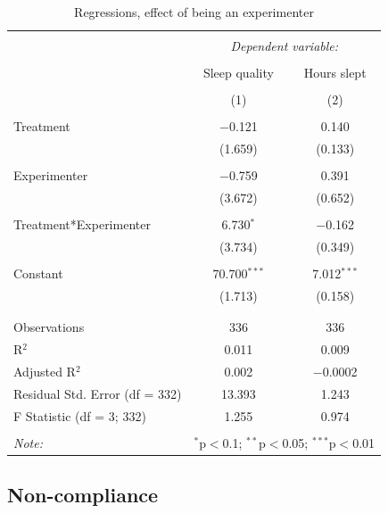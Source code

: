 \documentclass[12pt,]{article}
\begin{document}
\begin{table}[!htbp] \centering 
  \caption{\label{tab:experimenter_regression} Regressions, effect of being an experimenter} 
  \label{} 
\begin{tabular}{@{\extracolsep{5pt}}lcc} 
\\[-1.8ex]\hline 
\hline \\[-1.8ex] 
 & \multicolumn{2}{c}{\textit{Dependent variable:}} \\ 
\cline{2-3} 
\\[-1.8ex] & Sleep quality & Hours slept \\ 
\\[-1.8ex] & (1) & (2)\\ 
\hline \\[-1.8ex] 
 Treatment & $-$0.121 & 0.140 \\ 
  & (1.659) & (0.133) \\ 
  & & \\ 
 Experimenter & $-$0.759 & 0.391 \\ 
  & (3.672) & (0.652) \\ 
  & & \\ 
 Treatment*Experimenter & 6.730$^{*}$ & $-$0.162 \\ 
  & (3.734) & (0.349) \\ 
  & & \\ 
 Constant & 70.700$^{***}$ & 7.012$^{***}$ \\ 
  & (1.713) & (0.158) \\ 
  & & \\ 
\hline \\[-1.8ex] 
Observations & 336 & 336 \\ 
R$^{2}$ & 0.011 & 0.009 \\ 
Adjusted R$^{2}$ & 0.002 & $-$0.0002 \\ 
Residual Std. Error (df = 332) & 13.393 & 1.243 \\ 
F Statistic (df = 3; 332) & 1.255 & 0.974 \\ 
\hline 
\hline \\[-1.8ex] 
\textit{Note:}  & \multicolumn{2}{r}{$^{*}$p$<$0.1; $^{**}$p$<$0.05; $^{***}$p$<$0.01} \\ 
\end{tabular} 
\end{table}

\subsection{Non-compliance}\label{non-compliance}
\end{document}
